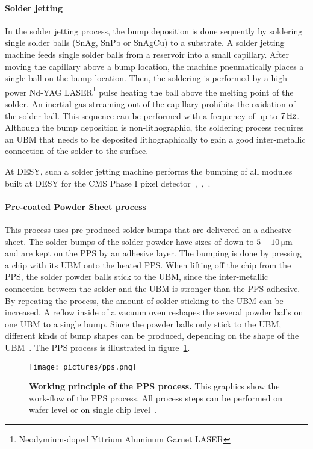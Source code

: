 \paragraph*{Solder jetting}
In the solder jetting process, the bump deposition is done sequently by soldering single solder balls (SnAg, SnPb or SnAgCu) to a substrate. A solder jetting machine feeds single solder balls from a reservoir into a small capillary. After moving the capillary above a bump location, the machine pneumatically places a single ball on the bump location. Then, the soldering is performed by a high power Nd-YAG LASER\footnote{Neodymium-doped Yttrium Aluminum Garnet LASER} pulse heating the ball above the melting point of the solder. An inertial gas streaming out of the capillary prohibits the oxidation of the solder ball. This sequence can be performed with a frequency of up to $7\,\rm{Hz}$. Although the bump deposition is non-lithographic, the soldering process requires an \ac{UBM} that needs to be deposited lithographically to gain a good inter-metallic connection of the solder to the surface.

At \ac{DESY}, such a solder jetting machine performs the bumping of all modules built at \ac{DESY} for the \ac{CMS} Phase I pixel detector~\cite{Ham12},~\cite{Bla02},~\cite{Pac13}.

\paragraph*{Pre-coated Powder Sheet process}\label{sec:PPS}
This process uses pre-produced solder bumps that are delivered on a adhesive sheet. The solder bumps of the solder powder have sizes of down to $5-10\,\si{\micro \meter}$ and are kept on the \ac{PPS} by an adhesive layer. The bumping is done by pressing a chip with its \ac{UBM} onto the heated \ac{PPS}. When lifting off the chip from the \ac{PPS}, the solder powder balls stick to the \ac{UBM}, since the inter-metallic connection between the solder and the \ac{UBM} is stronger than the \ac{PPS} adhesive. By repeating the process, the amount of solder sticking to the UBM can be increased. A reflow inside of a vacuum oven reshapes the several powder balls on one \ac{UBM} to a single bump. Since the powder balls only stick to the \ac{UBM}, different kinds of bump shapes can be produced, depending on the shape of the \ac{UBM}~\cite{Sen11}. The \ac{PPS} process is illustrated in figure~\ref{fig:PPS}.
\begin{figure}
\begin{center}
\texttt{[image: pictures/pps.png]}
\end{center}
\caption[Working principle of the Pre-coated Powder Sheet (PPS) process]{\textbf{Working principle of the \ac{PPS} process.} This graphics show the work-flow of the \ac{PPS} process. All process steps can be performed on wafer level or on single chip level~\cite{Sen11}.}\label{fig:PPS}
\end{figure}

